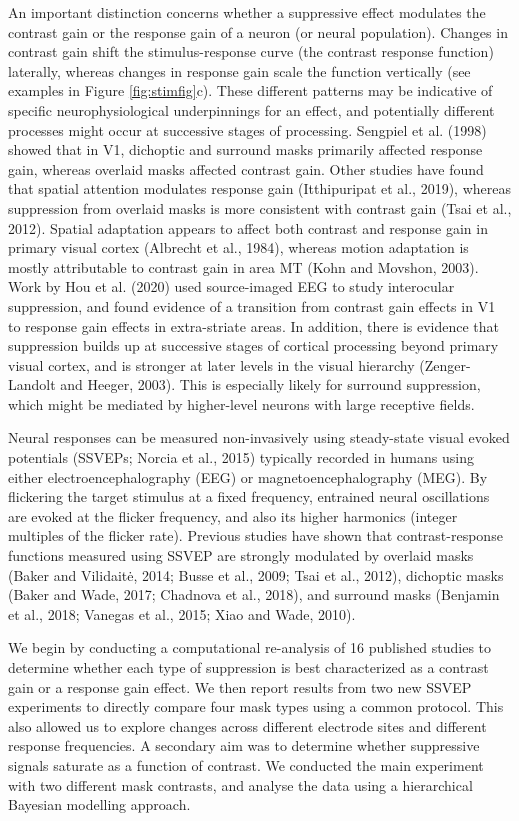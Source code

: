 \documentclass[]{article}
\begin{document}
An important distinction concerns whether a suppressive effect modulates the contrast gain or the response gain of a neuron (or neural population). Changes in contrast gain shift the stimulus-response curve (the contrast response function) laterally, whereas changes in response gain scale the function vertically (see examples in Figure \ref{fig:stimfig}c). These different patterns may be indicative of specific neurophysiological underpinnings for an effect, and potentially different processes might occur at successive stages of processing. Sengpiel et al. (1998) showed that in V1, dichoptic and surround masks primarily affected response gain, whereas overlaid masks affected contrast gain. Other studies have found that spatial attention modulates response gain (Itthipuripat et al., 2019), whereas suppression from overlaid masks is more consistent with contrast gain (Tsai et al., 2012). Spatial adaptation appears to affect both contrast and response gain in primary visual cortex (Albrecht et al., 1984), whereas motion adaptation is mostly attributable to contrast gain in area MT (Kohn and Movshon, 2003). Work by Hou et al. (2020) used source-imaged EEG to study interocular suppression, and found evidence of a transition from contrast gain effects in V1 to response gain effects in extra-striate areas. In addition, there is evidence that suppression builds up at successive stages of cortical processing beyond primary visual cortex, and is stronger at later levels in the visual hierarchy (Zenger-Landolt and Heeger, 2003). This is especially likely for surround suppression, which might be mediated by higher-level neurons with large receptive fields.

Neural responses can be measured non-invasively using steady-state visual evoked potentials (SSVEPs; Norcia et al., 2015) typically recorded in humans using either electroencephalography (EEG) or magnetoencephalography (MEG). By flickering the target stimulus at a fixed frequency, entrained neural oscillations are evoked at the flicker frequency, and also its higher harmonics (integer multiples of the flicker rate). Previous studies have shown that contrast-response functions measured using SSVEP are strongly modulated by overlaid masks (Baker and Vilidaitė, 2014; Busse et al., 2009; Tsai et al., 2012), dichoptic masks (Baker and Wade, 2017; Chadnova et al., 2018), and surround masks (Benjamin et al., 2018; Vanegas et al., 2015; Xiao and Wade, 2010).

We begin by conducting a computational re-analysis of 16 published studies to determine whether each type of suppression is best characterized as a contrast gain or a response gain effect. We then report results from two new SSVEP experiments to directly compare four mask types using a common protocol. This also allowed us to explore changes across different electrode sites and different response frequencies. A secondary aim was to determine whether suppressive signals saturate as a function of contrast. We conducted the main experiment with two different mask contrasts, and analyse the data using a hierarchical Bayesian modelling approach.
\end{document}
